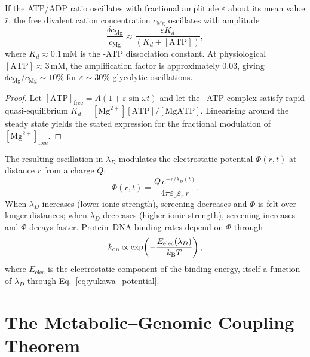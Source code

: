 \begin{lemma}
\label{lem:ionic_strength_osc}
If the ATP/ADP ratio oscillates with fractional amplitude $\varepsilon$ about
its mean value $\bar{r}$, the free divalent cation concentration
$c_{\mathrm{Mg}}$ oscillates with amplitude
\begin{equation}
  \frac{\delta c_{\mathrm{Mg}}}{c_{\mathrm{Mg}}} \approx
  \frac{\varepsilon K_d}{(K_d + [\text{ATP}])},
  \label{eq:mg_amplitude}
\end{equation}
where $K_d \approx 0.1$\,mM is the -ATP dissociation constant.
At physiological $[\text{ATP}] \approx 3$\,mM, the amplification factor is
approximately 0.03, giving $\delta c_{\mathrm{Mg}}/c_{\mathrm{Mg}} \sim 10\%$
for $\varepsilon \sim 30\%$ glycolytic oscillations.
\end{lemma}

\begin{proof}
Let $[\text{ATP}]_{\mathrm{free}} = A(1 + \varepsilon\sin\omega t)$ and let
the --ATP complex satisfy rapid quasi-equilibrium
$K_d = [\text{Mg}^{2+}][\text{ATP}]/[\text{MgATP}]$. Linearising around the
steady state yields the stated expression for the fractional modulation of
$[\text{Mg}^{2+}]_{\mathrm{free}}$.
\end{proof}

The resulting oscillation in $\lambda_D$ modulates the electrostatic potential
$\Phi(r, t)$ at distance $r$ from a charge $Q$:
\begin{equation}
  \Phi(r,t) = \frac{Q\,e^{-r/\lambda_D(t)}}{4\pi\varepsilon_0\varepsilon_r\,r}.
  \label{eq:yukawa_potential}
\end{equation}
When $\lambda_D$ increases (lower ionic strength), screening decreases and
$\Phi$ is felt over longer distances; when $\lambda_D$ decreases (higher
ionic strength), screening increases and $\Phi$ decays faster. Protein--DNA
binding rates depend on $\Phi$ through
\begin{equation}
  k_{\mathrm{on}} \propto \exp\!\left(-\frac{E_{\mathrm{elec}}(\lambda_D)}{k_{\mathrm{B}} T}\right),
  \label{eq:kon_activation}
\end{equation}
where $E_{\mathrm{elec}}$ is the electrostatic component of the binding
energy, itself a function of $\lambda_D$ through Eq.~\eqref{eq:yukawa_potential}.

\section{The Metabolic--Genomic Coupling Theorem}
\label{sec:metabolic_genomic_coupling}

